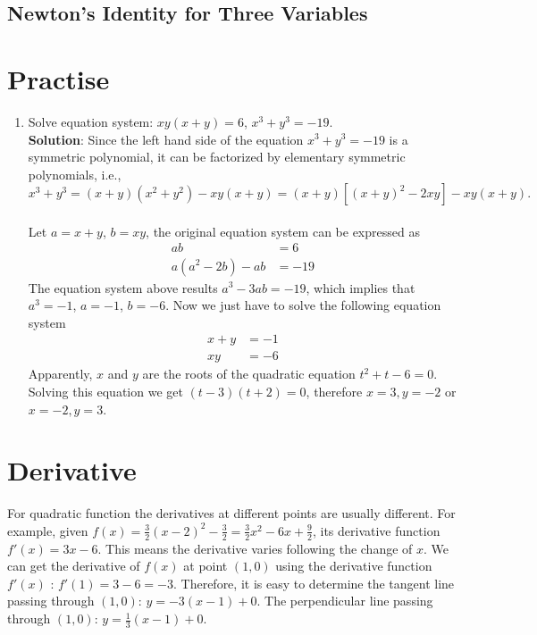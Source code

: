 \documentclass[11pt, oneside]{article}   	%
\begin{document}
\subsection{Newton's Identity for Three Variables}



\section{Practise}
\begin{enumerate}
\item
Solve equation system: $xy(x+y)=6$, $x^3+y^3=-19$.\\
\textbf{Solution}: 
Since the left hand side of the equation $x^3+y^3=-19$ is a symmetric polynomial, it can be factorized by elementary symmetric polynomials, i.e.,
\[x^3+y^3 =  (x+y)(x^2+y^2)-xy(x+y) = (x+y)[(x+y)^2-2xy]-xy(x+y).\] \\
Let $a=x+y$, $b=xy$, the original equation system can be expressed as 
\begin{align*}
ab &= 6\\
a(a^2-2b)-ab&=-19
\end{align*}
The equation system above results $a^3-3ab=-19$, which implies that $a^3=-1$, $a=-1$, $b=-6$.
Now we just have to solve the following equation system
\begin{align*}
x+y&=-1\\
xy&=-6
\end{align*}
Apparently, $x$ and $y$ are the roots of the quadratic equation $t^2+t-6=0$. Solving this equation we get $(t-3)(t+2)=0$, therefore $x=3, y=-2$ or $x=-2, y=3$.
\end{enumerate}



\newpage
\section{Derivative}
For quadratic function the derivatives at different points are usually different. For example, given $f(x)=\frac{3}{2}(x-2)^2-\frac{3}{2}=\frac{3}{2}x^2-6x+\frac{9}{2}$, its derivative function $f'(x)=3x-6$. This means the derivative varies following the change of $x$. We can get the derivative of $f(x)$ at point $(1,0)$ using the derivative function $f'(x)$ : $f'(1)=3-6=-3$. Therefore, it is easy to determine the tangent line passing through $(1,0)$: $y=-3(x-1)+0$. The perpendicular line passing through $(1,0)$: $y=\frac{1}{3}(x-1)+0$. 
\end{document}
